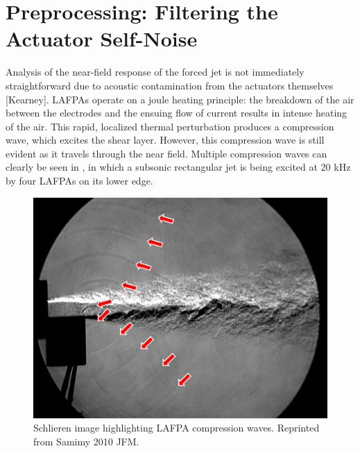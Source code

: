\section{Preprocessing: Filtering the Actuator Self-Noise}
Analysis of the near-field response of the forced jet is not immediately straightforward due to acoustic contamination from the actuators themselves [Kearney]. 
LAFPAs operate on a joule heating principle: the breakdown of the air between the electrodes and the ensuing flow of current results in intense heating of the air. This rapid, localized thermal perturbation produces a compression wave, which excites the shear layer. 
However, this compression wave is still evident as it travels through the near field. 
Multiple compression waves can clearly be seen in , in which a subsonic rectangular jet is being excited at 20 kHz by four LAFPAs on its lower edge. \begin{figure}
	\centering
	\includegraphics{Figures/Samimy2010JFM.jpg}
	\caption{Schlieren image highlighting LAFPA compression waves. Reprinted from Samimy 2010 JFM.}
	\label{fig:self-noise}
\end{figure}

